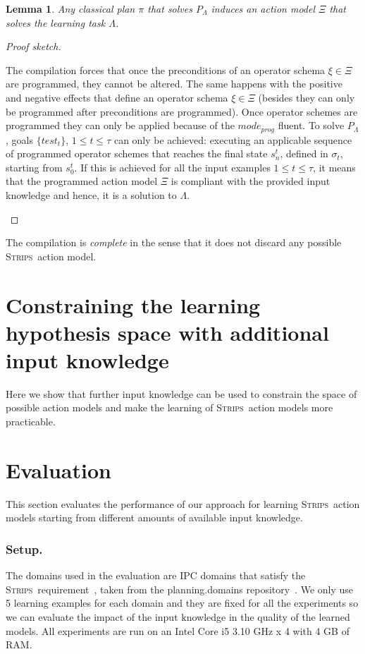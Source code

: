 \documentclass{article}
\newcommand{\strips}{\textsc{Strips}}     %
\newtheorem{lemma}[theorem]{Lemma}
\begin{document}
\begin{lemma}
Any classical plan $\pi$ that solves $P_{\Lambda}$ induces an action model $\Xi$ that solves the learning task $\Lambda$.
\end{lemma}

\begin{proof}[Proof sketch]
\begin{small}
The compilation forces that once the preconditions of an operator schema $\xi \in \Xi$ are programmed, they cannot be altered. The same happens with the positive and negative effects that define an operator schema $\xi \in \Xi$ (besides they can only be programmed after preconditions are programmed). Once operator schemes are programmed they can only be applied because of the $mode_{prog}$ fluent. To solve $P_{\Lambda}$, goals $\{test_t\}$, {\small $1\leq t\leq \tau$} can only be achieved: executing an applicable sequence of programmed operator schemes that reaches the final state $s_n^t$, defined in $\sigma_t$, starting from $s_0^t$. If this is achieved for all the input examples {\small $1\leq t\leq \tau$}, it means that the programmed action model $\Xi$ is compliant with the provided input knowledge and hence, it is a solution to $\Lambda$.
\end{small}
\end{proof}

The compilation is {\em complete} in the sense that it does not discard any possible \strips\ action model.







\section{Constraining the learning hypothesis space with additional input knowledge}
\label{sec:Constraining}
Here we show that further input knowledge can be used to constrain the space of possible action models and make the learning of \strips\ action models more practicable.

\section{Evaluation}
This section evaluates the performance of our approach for learning \strips\ action models starting from different amounts of available input knowledge.

\subsubsection{Setup.}
The domains used in the evaluation are IPC domains that satisfy the \strips\ requirement~\cite{fox2003pddl2}, taken from the {\sc planning.domains} repository~\cite{muise2016planning}. We only use 5 learning examples for each domain and they are fixed for all the experiments so we can evaluate the impact of the input knowledge in the quality of the learned models. All experiments are run on an Intel Core i5 3.10 GHz x 4 with 4 GB of RAM.
\end{document}
